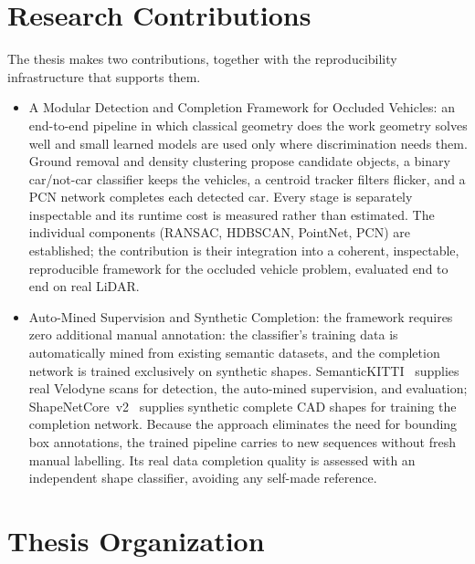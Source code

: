 \documentclass[a4paper,12pt]{report}
\begin{document}
\section{Research Contributions}
\label{sec:intro-contributions}

The thesis makes two contributions, together with the reproducibility infrastructure
that supports them.

\begin{itemize}
  \item A Modular Detection and Completion Framework for Occluded Vehicles:
    an end-to-end pipeline in which classical geometry does the work geometry solves
    well and small learned models are used only where discrimination needs them.
    Ground removal and density clustering propose candidate objects, a binary
    car/not-car classifier keeps the vehicles, a centroid tracker filters flicker, and
    a PCN network completes each detected car. Every stage is separately inspectable and
    its runtime cost is measured rather than estimated. The individual components
    (RANSAC, HDBSCAN, PointNet, PCN) are established; the contribution is their
    integration into a coherent, inspectable, reproducible framework for the occluded
    vehicle problem, evaluated end to end on real LiDAR.

  \item Auto-Mined Supervision and Synthetic Completion:
    the framework requires zero additional manual annotation: the classifier's training
    data is automatically mined from existing semantic datasets, and the completion
    network is trained exclusively on synthetic shapes.
    SemanticKITTI~\cite{Behley_2019_ICCV} supplies real Velodyne scans for detection, the
    auto-mined supervision, and evaluation; ShapeNetCore~v2~\cite{chang2015shapenetinformationrich3dmodel}
    supplies synthetic complete CAD shapes for training the completion network. Because
    the approach eliminates the need for bounding box annotations, the trained pipeline
    carries to new sequences without fresh manual labelling. Its real data completion
    quality is assessed with an independent shape classifier, avoiding any self-made
    reference.

\end{itemize}

\section{Thesis Organization}
\label{sec:intro-outline}
\end{document}
